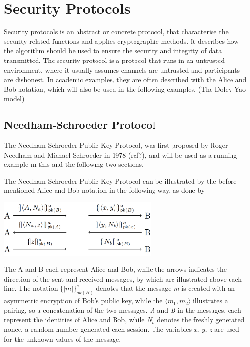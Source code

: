 \section{Security Protocols} %
Security protocols is an abstract or concrete protocol, that characterise the security related functions and applies cryptographic methods. It describes how the algorithm should be used to ensure the security and integrity of data transmitted. The security protocol is a protocol that runs in an untrusted environment, where it usually assumes channels are untrusted and participants are dishonest. In academic examples, they are often described with the Alice and Bob notation, which will also be used in the following examples. (The Dolev-Yao model) 


\subsection{Needham-Schroeder Protocol}
The Needham-Schroeder Public Key Protocol, was first proposed by Roger Needham and Michael Schroeder in 1978 (ref?), and will be used as a running example in this and the following two sections. %

The Needham-Schroeder Public Key Protocol can be illustrated by the before mentioned Alice and Bob notation in the following way, as done by \citeauthor{DBLP:journals/ftpl/CortierK14}

\begin{center}
\includegraphics[width=0.6\textwidth, angle=0]{Graphics/NS_Protocol.pdf}
\end{center}

The A and B each represent Alice and Bob, while the arrows indicates the direction of the sent and received messages, by which are illustrated above each line. The notation $\{| m |\}^a_{pk(B)}$ denotes that the message \textit{m} is created with an asymmetric encryption of Bob's public key, while the $\langle m_1, m_2 \rangle$ illustrates a pairing, so a concatenation of the two messages. \textit{A} and \textit{B} in the messages, each represent the identities of Alice and Bob, while \textit{N$_a$} denotes the freshly generated nonce, a random number generated each session. The variables \textit{x, y, z} are used for the unknown values of the message.

